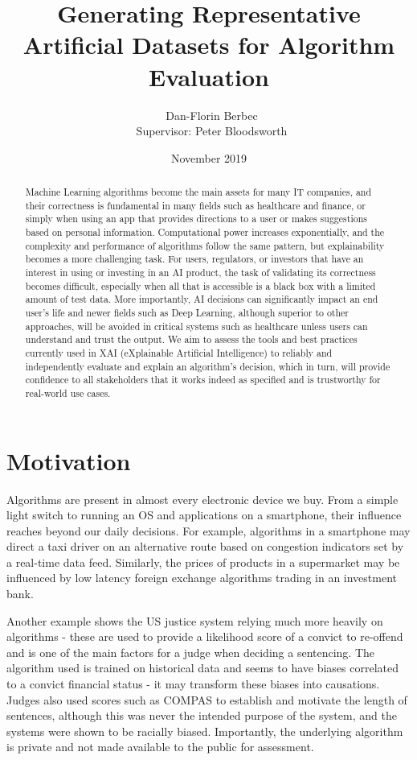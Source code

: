 \documentclass[proposal]{softeng}
\title{Generating Representative Artificial Datasets for Algorithm Evaluation}
\author{\ Dan-Florin Berbec \\ \ Supervisor: Peter Bloodsworth}
\date{November 2019}
\begin{document}
    \maketitle

    \newpage
    \clearpage\mbox{}\clearpage

    \begin{abstract}
        Machine Learning algorithms become the main assets for many IT companies, and their correctness is fundamental in many fields such as healthcare and finance, or simply when using an app that provides directions to a user or makes suggestions based on personal information. Computational power increases exponentially, and the complexity and performance of algorithms follow the same pattern, but explainability becomes a more challenging task. For users, regulators, or investors that have an interest in using or investing in an AI product, the task of validating its correctness becomes difficult, especially when all that is accessible is a black box with a limited amount of test data. More importantly, AI decisions can significantly impact an end user's life and newer fields such as Deep Learning, although superior to other approaches, will be avoided in critical systems such as healthcare unless users can understand and trust the output. We aim to assess the tools and best practices currently used in XAI (eXplainable Artificial Intelligence) to reliably and independently evaluate and explain an algorithm's decision, which in turn, will provide confidence to all stakeholders that it works indeed as specified and is trustworthy for real-world use cases.
    \end{abstract}
    \setcounter{secnumdepth}{4}
    \setcounter{tocdepth}{4}
    \tableofcontents
    \newpage


    \section{Motivation}
    Algorithms are present in almost every electronic device we buy. From a simple light switch to running an OS and applications on a smartphone, their influence reaches beyond our daily decisions. For example, algorithms in a smartphone may direct a taxi driver on an alternative route based on congestion indicators set by a real-time data feed. Similarly, the prices of products in a supermarket may be influenced by low latency foreign exchange algorithms trading in an investment bank.

    Another example shows the US justice system relying much more heavily on algorithms - these are used to provide a likelihood score of a convict to re-offend and is one of the main factors for a judge when deciding a sentencing\cite{jail}. The algorithm used is trained on historical data and seems to have biases correlated to a convict financial status - it may transform these biases into causations. Judges also used scores such as COMPAS to establish and motivate the length of sentences, although this was never the intended purpose of the system, and the systems were shown to be racially biased\cite{machine-bias}. Importantly, the underlying algorithm is private and not made available to the public for assessment.
\end{document}
